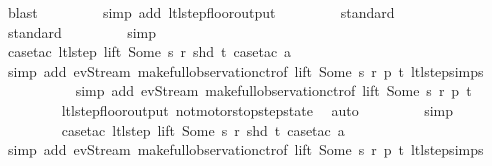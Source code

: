 \begin{isabellebody}
\ blast\isanewline
\ \ \ \ \ \ \ \isamarkupfalse%
\ {\isacharparenleft}simp\ add{\isacharcolon}\ ltl{\isacharunderscore}step{\isacharunderscore}floor{\isacharunderscore}output{\isacharparenright}\isanewline
\ \ \ \ \ \ \ \isamarkupfalse%
\ standard\isanewline
\ \ \ \ \ \ \ \isamarkupfalse%
\ standard\isanewline
\ \ \ \ \ \ \ \isamarkupfalse%
\ simp\isanewline
\ \ \ \ \ \ \ \ \isamarkupfalse%
\ {\isacharparenleft}case{\isacharunderscore}tac\ {\isachardoublequoteopen}ltl{\isacharunderscore}step\ lift\ {\isacharparenleft}Some\ s{\isacharparenright}\ r\ {\isacharparenleft}shd\ t{\isacharparenright}{\isachardoublequoteclose}{\isacharcomma}\ case{\isacharunderscore}tac\ a{\isacharparenright}\isanewline
\ \ \ \ \ \ \ \ \ \isamarkupfalse%
\ {\isacharparenleft}simp\ add{\isacharcolon}\ ev{\isacharunderscore}Stream\ make{\isacharunderscore}full{\isacharunderscore}observation{\isachardot}ctr{\isacharbrackleft}of\ lift\ {\isachardoublequoteopen}Some\ s{\isachardoublequoteclose}\ r\ p\ t{\isacharbrackright}\ ltl{\isacharunderscore}step{\isachardot}simps{\isacharparenright}\isanewline
\ \ \ \ \ \ \ \ \ \isamarkupfalse%
\ {\isacharparenleft}simp\ add{\isacharcolon}\ ev{\isacharunderscore}Stream\ make{\isacharunderscore}full{\isacharunderscore}observation{\isachardot}ctr{\isacharbrackleft}of\ lift\ {\isachardoublequoteopen}Some\ s{\isachardoublequoteclose}\ r\ p\ t{\isacharbrackright}{\isacharparenright}\isanewline
\ \ \ \ \ \ \ \isamarkupfalse%
\ ltl{\isacharunderscore}step{\isacharunderscore}floor{\isacharunderscore}output\ not{\isacharunderscore}motorstop{\isacharunderscore}step{\isacharunderscore}state\ \isamarkupfalse%
\ auto{\isacharbrackleft}{}{\isacharbrackright}\isanewline
\ \ \ \ \ \ \ \isamarkupfalse%
\ simp\isanewline
\ \ \ \ \ \ \ \isamarkupfalse%
\ {\isacharparenleft}case{\isacharunderscore}tac\ {\isachardoublequoteopen}ltl{\isacharunderscore}step\ lift\ {\isacharparenleft}Some\ s{\isacharparenright}\ r\ {\isacharparenleft}shd\ t{\isacharparenright}{\isachardoublequoteclose}{\isacharcomma}\ case{\isacharunderscore}tac\ a{\isacharparenright}\isanewline
\ \ \ \ \ \ \ \ \isamarkupfalse%
\ {\isacharparenleft}simp\ add{\isacharcolon}\ ev{\isacharunderscore}Stream\ make{\isacharunderscore}full{\isacharunderscore}observation{\isachardot}ctr{\isacharbrackleft}of\ lift\ {\isachardoublequoteopen}Some\ s{\isachardoublequoteclose}\ r\ p\ t{\isacharbrackright}\ ltl{\isacharunderscore}step{\isachardot}simps{\isacharparenright}\isanewline

\end{isabellebody}
